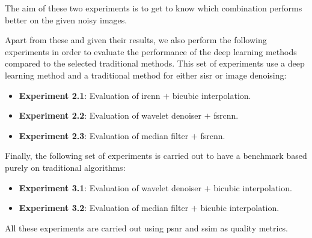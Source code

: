 The aim of these two experiments is to get to know which combination performs better on the given noisy images.

Apart from these and given their results, we also perform the following experiments in order to evaluate the performance of the deep learning methods compared to the selected traditional methods. This set of experiments use a deep learning method and a traditional method for either \gls{sisr} or image denoising:
\begin{itemize}
	\item \textbf{Experiment 2.1}: Evaluation of \gls{ircnn} $+$ bicubic interpolation.
	\item \textbf{Experiment 2.2}: Evaluation of wavelet denoiser $+$ \gls{fsrcnn}.
	\item \textbf{Experiment 2.3}: Evaluation of median filter $+$ \gls{fsrcnn}.
\end{itemize}

Finally, the following set of experiments is carried out to have a benchmark based purely on traditional algorithms:
\begin{itemize}
\item \textbf{Experiment 3.1}:  Evaluation of wavelet denoiser $+$ bicubic interpolation.
\item \textbf{Experiment 3.2}:  Evaluation of median filter $+$ bicubic interpolation.
\end{itemize}
All these experiments are carried out using \gls{psnr} and \gls{ssim} as quality metrics.